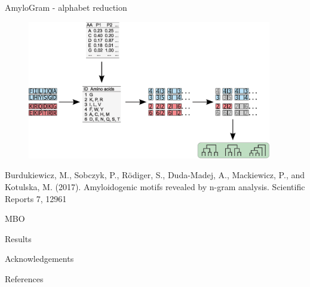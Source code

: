 \documentclass{beamer}
\begin{document}
\begin{frame}{AmyloGram - alphabet reduction}
  \begin{figure} 
    \includegraphics[width=0.95\textwidth]{figures/ngram3.eps}
  \end{figure}

  \tiny{Burdukiewicz, M., Sobczyk, P., Rödiger, S., Duda-Madej, A., Mackiewicz, P., and Kotulska, M. (2017). Amyloidogenic motifs revealed by n-gram analysis. Scientific Reports 7, 12961}
\end{frame}


\begin{frame}{MBO}

\end{frame} 

\begin{frame}{Results}

\end{frame} 

\begin{frame}{Acknowledgements}

\end{frame} 

\begin{frame}{References}

\end{frame} 
\end{document}
